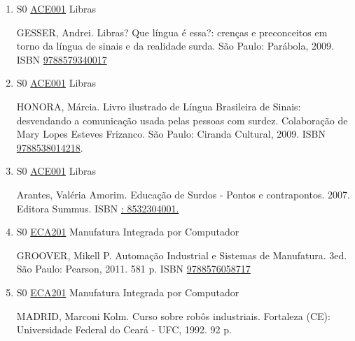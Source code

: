 \documentclass[12pt,a4paper]{book}
\begin{document}
\begin{enumerate}
 RIBEIRO, J.;  FOGLIATTO, F.;  Confiabilidade e Manutenção Industrial.  1ª edição.  Rio de Janeiro.  Editora CAMPUS.  2009.  288p.  ISBN \href{http://www.bn.br/site/pages/servicosProfissionais/agenciaISBN/isbnBusca/FbnBuscaISBNCatalogo.asp?pField=ISBN&pIntPagina=1&pISBN=35233537&nidbISBN=true&hidbISBN=true}{9788535233537}.
 \item S0 \hyperref[PUD:ACE001]{ACE001} Libras

  GESSER, Andrei.  Libras? Que língua é essa?: crenças e preconceitos em 
torno da língua de sinais e da realidade surda.  São Paulo: Parábola, 
2009.  ISBN \href{http://www.bn.br/site/pages/servicosProfissionais/agenciaISBN/isbnBusca/FbnBuscaISBNCatalogo.asp?pField=ISBN&pIntPagina=1&pISBN=79340017&nidbISBN=true&hidbISBN=true}{9788579340017}

 
 
 \item S0 \hyperref[PUD:ACE001]{ACE001} Libras

  HONORA, Márcia.  Livro ilustrado de Língua Brasileira de Sinais: desvendando a comunicação usada pelas pessoas com surdez.  Colaboração de  Mary Lopes Esteves Frizanco.  São Paulo: Ciranda Cultural, 2009.  ISBN \href{http://www.bn.br/site/pages/servicosProfissionais/agenciaISBN/isbnBusca/FbnBuscaISBNCatalogo.asp?pField=ISBN&pIntPagina=1&pISBN=38014218&nidbISBN=true&hidbISBN=true}{9788538014218}. 

 
 
 \item S0 \hyperref[PUD:ACE001]{ACE001} Libras

  Arantes, Valéria Amorim.  Educação de Surdos - Pontos e contrapontos.  2007.  Editora Summus.  ISBN \href{http://www.google.com/search?hl=pt-BR&tbo=p&tbm=bks&q=isbn:: 8532304001.&num=10}{: 8532304001.}
 \item S0 \hyperref[PUD:ECA201]{ECA201} Manufatura Integrada por Computador

 GROOVER, Mikell P.  Automação Industrial e Sistemas de Manufatura.  3ed.  São Paulo: Pearson, 2011.  581 p.  ISBN \href{http://www.bn.br/site/pages/servicosProfissionais/agenciaISBN/isbnBusca/FbnBuscaISBNCatalogo.asp?pField=ISBN&pIntPagina=1&pISBN=76058717&nidbISBN=true&hidbISBN=true}{9788576058717}
 
 
 \item S0 \hyperref[PUD:ECA201]{ECA201} Manufatura Integrada por Computador

 MADRID, Marconi Kolm.  Curso sobre robôs industriais.  Fortaleza (CE): Universidade Federal do Ceará - UFC, 1992.  92 p. 
 

\end{enumerate}
\end{document}
